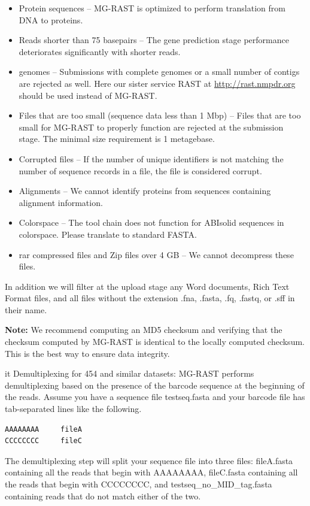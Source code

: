 \documentclass[12pt,fullpage]{report}
\begin{document}
\begin{itemize}
\item Protein sequences --
MG-RAST is optimized to perform translation from DNA to proteins.

\item Reads shorter than 75 basepairs --
The gene prediction stage performance deteriorates significantly with shorter reads.

\item genomes --
Submissions with complete genomes or a small number of contigs are rejected as well. Here our sister service RAST at \url{http://rast.nmpdr.org} should be used instead of MG-RAST.

\item Files that are too small (sequence data less than 1 Mbp) --
Files that are too small for MG-RAST to properly function are rejected at the submission stage. The minimal size requirement is 1 metagebase.

\item Corrupted files --
If the number of unique identifiers is not matching the number of sequence records in a file, the file is considered corrupt.

\item Alignments --
We cannot identify proteins from sequences containing alignment information.

\item Colorspace --
The tool chain does not function for ABIsolid sequences in colorspace. Please translate to standard FASTA.

\item rar compressed files and Zip files over 4 GB --
We cannot decompress these files.

\end{itemize}

In addition we will filter at the upload stage any Word documents, Rich Text Format files, and all
files without the extension .fna, .fasta, .fq, .fastq, or .sff in their name.


\textbf{Note:} We recommend computing an \gls{MD5} checksum and verifying that the checksum computed by MG-RAST is identical to the locally computed checksum. This is the best way to ensure data integrity.

{it Demultiplexing for 454 and similar datasets}:
MG-RAST performs demultiplexing based on the presence of the barcode sequence at the beginning of the reads.
Assume you have a sequence file testseq.fasta and your barcode file has tab-separated lines like the following.
\begin{verbatim}
AAAAAAAA     fileA
CCCCCCCC     fileC
\end{verbatim}
The demultiplexing step will split your sequence file into three files:
fileA.fasta containing all the reads that begin with AAAAAAAA,
fileC.fasta containing all the reads that begin with CCCCCCCC,
and
testseq\_no\_MID\_tag.fasta containing reads that do not match either of the two.
\end{document}
